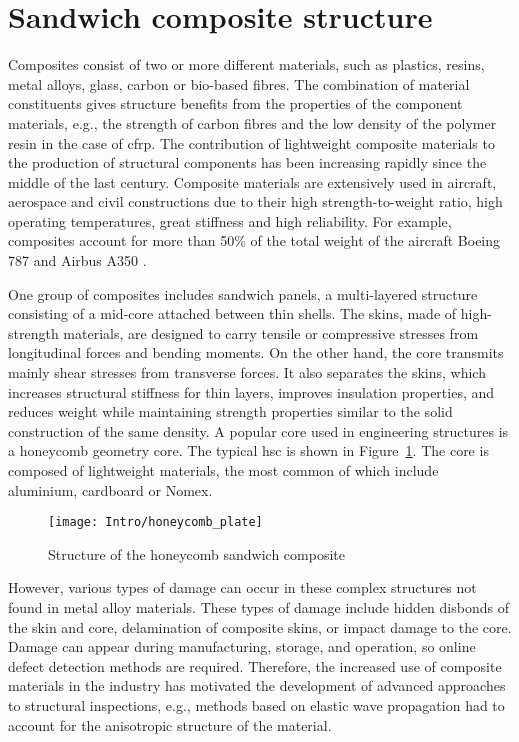 \section{Sandwich composite structure}
\label{sec:scs}

Composites consist of two or more different materials, such as plastics, resins, metal alloys, glass, carbon or bio-based fibres. The combination of material constituents gives  structure benefits from the properties of the component materials, e.g., the strength of carbon fibres and the low density of the polymer resin in the case of \ac{cfrp}.
The contribution of lightweight composite materials to the production of structural components has been increasing rapidly since the middle of the last century.
Composite materials are extensively used in aircraft, aerospace and civil constructions due to their high strength-to-weight ratio, high operating temperatures, great stiffness and high reliability.
For example, composites account for more than 50\% of the total weight of the aircraft Boeing 787 and Airbus A350 \cite{giurgiutiu2015structural}.

One group of composites includes sandwich panels, a multi-layered structure consisting of a mid-core attached between thin shells.
The skins, made of high-strength materials, are designed to carry tensile or compressive stresses from longitudinal forces and bending moments.
On the other hand, the core transmits mainly shear stresses from transverse forces.
It also separates the skins, which increases structural stiffness for thin layers, improves insulation properties, and reduces weight while maintaining strength properties similar to the solid construction of the same density.
A popular core used in engineering structures is a honeycomb geometry core. 
The typical \ac{hsc} is shown in Figure~\ref{fig:hcp}.
The core is composed of lightweight materials, the most common of which include aluminium, cardboard or Nomex\textsuperscript{\tiny\textregistered}.
\begin{figure}[H] %
	\begin{center}
		\texttt{[image: Intro/honeycomb\_plate]}
		\caption{
			\label{fig:hcp} Structure of the honeycomb sandwich composite}
		\vspace{-0.5cm}
	\end{center}
\end{figure}

However, various types of damage can occur in these complex structures not found in metal alloy materials. These types of damage include hidden disbonds of the skin and core, delamination of composite skins, or impact damage to the core.
Damage can appear during manufacturing, storage, and operation, so online defect detection methods are required.
Therefore, the increased use of composite materials in the industry has motivated the development of advanced approaches to structural inspections, e.g., methods based on elastic wave propagation had to account for the anisotropic structure of the material.